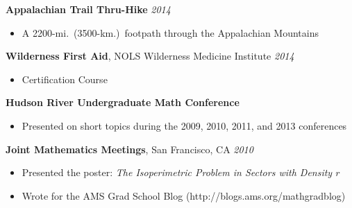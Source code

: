 \documentclass[margin]{res}
\begin{document}
\begin{resume}
	{\bf Appalachian Trail Thru-Hike} \hfill {\sl 2014}
	\begin{itemize}  \itemsep -2pt
	\item A 2200-mi.\ (3500-km.)\ footpath through the Appalachian Mountains
	\end{itemize}
	
	{\bf Wilderness First Aid}, NOLS Wilderness Medicine Institute \hfill {\sl 2014}
	\begin{itemize}  \itemsep -2pt
	\item Certification Course
	\end{itemize}

	{\bf Hudson River Undergraduate Math Conference}
	\begin{itemize}  \itemsep -2pt
	\item Presented on short topics during the 2009, 2010, 2011, and 2013 conferences
	\end{itemize}

	{\bf Joint Mathematics Meetings}, San Francisco, CA \hfill {\sl 2010}
	\begin{itemize}  \itemsep -2pt
	\item Presented the poster: {\sl The Isoperimetric Problem in Sectors with Density $r$}
	\item Wrote for the AMS Grad School Blog (http://blogs.ams.org/mathgradblog)
	\end{itemize}	
 
\end{resume}
\end{document}
